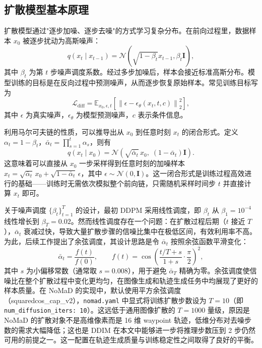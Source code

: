 \subsection{扩散模型基本原理}

扩散模型通过"逐步加噪、逐步去噪"的方式学习复杂分布\cite{ddpm2020}。在前向过程里，数据样本 $x_0$ 被逐步扰动为高斯噪声：
\begin{equation}
q(x_t \mid x_{t-1}) = \mathcal{N}\!\left(\sqrt{1-\beta_t}x_{t-1}, \beta_t \mathbf{I}\right),
\end{equation}
其中 $\beta_t$ 为第 $t$ 步噪声调度系数。经过多步加噪后，样本会接近标准高斯分布。模型训练的目标是在反向过程中预测噪声，从而逐步恢复原始样本。常见训练目标写为
\begin{equation}
\mathcal{L}_{\text{diff}} = \mathbb{E}_{x_0,\epsilon,t}\left[\left\|\epsilon - \epsilon_\theta(x_t, t, c)\right\|_2^2\right],
\end{equation}
其中 $\epsilon$ 为真实噪声，$\epsilon_\theta$ 为模型预测噪声，$c$ 表示条件信息。

利用马尔可夫链的性质，可以推导出从 $x_0$ 到任意时刻 $x_t$ 的闭合形式。定义 $\alpha_t = 1 - \beta_t$，$\bar{\alpha}_t = \prod_{s=1}^{t} \alpha_s$，则有
\begin{equation}
q(x_t \mid x_0) = \mathcal{N}\!\left(\sqrt{\bar{\alpha}_t}\, x_0,\; (1 - \bar{\alpha}_t)\mathbf{I}\right).
\label{eq:closed-form-forward}
\end{equation}
这意味着可以直接从 $x_0$ 一步采样得到任意时刻的加噪样本 $x_t = \sqrt{\bar{\alpha}_t}\, x_0 + \sqrt{1 - \bar{\alpha}_t}\, \epsilon$，其中 $\epsilon \sim \mathcal{N}(0, \mathbf{I})$。这一闭合形式是训练过程高效进行的基础——训练时无需依次模拟整个前向链，只需随机采样时间步 $t$ 并直接计算 $x_t$ 即可。

关于噪声调度 $\{\beta_t\}_{t=1}^{T}$ 的设计，最初 DDPM 采用线性调度，即 $\beta_t$ 从 $\beta_1 = 10^{-4}$ 线性增长到 $\beta_T = 0.02$。然而线性调度存在一个问题：在扩散过程后期（$t$ 接近 $T$），$\bar{\alpha}_t$ 衰减过快，导致大量扩散步骤的信噪比集中在极低区间，有效利用率不高。为此，后续工作提出了余弦调度\cite{nichol2021improved}，其设计思路是令 $\bar{\alpha}_t$ 按照余弦函数平滑变化：
\begin{equation}
\bar{\alpha}_t = \frac{f(t)}{f(0)}, \qquad f(t) = \cos\!\left(\frac{t/T + s}{1 + s}\cdot\frac{\pi}{2}\right)^2,
\end{equation}
其中 $s$ 为小偏移常数（通常取 $s = 0.008$），用于避免 $\bar{\alpha}_T$ 精确为零。余弦调度使信噪比在整个扩散过程中变化更均匀，在图像生成和轨迹生成任务中均展现了更好的样本质量。在 NoMaD 的实现中，默认使用平方余弦调度（squaredcos\_cap\_v2），\texttt{nomad.yaml} 中显式将训练扩散步数设为 $T = 10$（即 \texttt{num\_diffusion\_iters: 10}）。这远低于通用图像扩散的 $T = 1000$ 量级，原因是 NoMaD 的扩散对象不是高维像素而是 16 维 waypoint 轨迹，低维分布对去噪步数的需求大幅降低；这也是 DDIM 在本文中能够进一步将推理步数压到 2 步仍然可用的前提之一。这一配置在轨迹生成质量与训练稳定性之间取得了良好的平衡。

